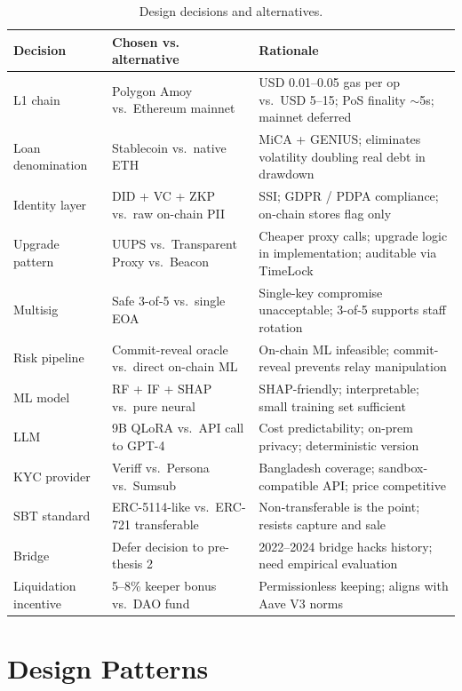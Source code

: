 \documentclass[12pt,a4paper]{report}
\begin{document}
\begin{table}[!t]
\centering
\caption{Design decisions and alternatives.}
\label{tab:design-decisions}
\small
\begin{tabularx}{\linewidth}{@{}p{3.6cm}p{3.4cm}Y@{}}
\toprule
\textbf{Decision} & \textbf{Chosen vs. alternative} & \textbf{Rationale} \\
\midrule
L1 chain & Polygon Amoy vs.\ Ethereum mainnet & USD 0.01--0.05 gas per op vs.\ USD 5--15; PoS finality $\sim$5s; mainnet deferred \\
Loan denomination & Stablecoin vs.\ native ETH & MiCA + GENIUS; eliminates volatility doubling real debt in drawdown \\
Identity layer & DID + VC + ZKP vs.\ raw on-chain PII & SSI; GDPR / PDPA compliance; on-chain stores flag only \\
Upgrade pattern & UUPS vs.\ Transparent Proxy vs.\ Beacon & Cheaper proxy calls; upgrade logic in implementation; auditable via TimeLock \\
Multisig & Safe 3-of-5 vs.\ single EOA & Single-key compromise unacceptable; 3-of-5 supports staff rotation \\
Risk pipeline & Commit-reveal oracle vs.\ direct on-chain ML & On-chain ML infeasible; commit-reveal prevents relay manipulation \\
ML model & RF + IF + SHAP vs.\ pure neural & SHAP-friendly; interpretable; small training set sufficient \\
LLM & 9B QLoRA vs.\ API call to GPT-4 & Cost predictability; on-prem privacy; deterministic version \\
KYC provider & Veriff vs.\ Persona vs.\ Sumsub & Bangladesh coverage; sandbox-compatible API; price competitive \\
SBT standard & ERC-5114-like vs.\ ERC-721 transferable & Non-transferable is the point; resists capture and sale \\
Bridge & Defer decision to pre-thesis 2 & 2022--2024 bridge hacks history; need empirical evaluation \\
Liquidation incentive & 5--8\% keeper bonus vs.\ DAO fund & Permissionless keeping; aligns with Aave V3 norms \\
\bottomrule
\end{tabularx}
\end{table}

\section{Design Patterns}
\label{sec:patterns}
\end{document}
